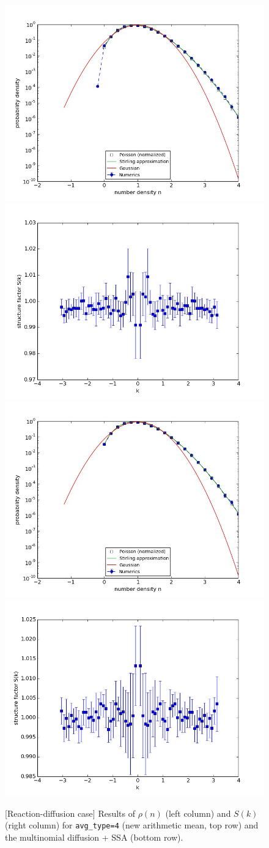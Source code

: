 \documentclass{article}
\begin{document}
\begin{figure}[ht!]
\includegraphics[width=0.5\linewidth]{fig1/react_hist_avg4.jpg}
\includegraphics[width=0.5\linewidth]{fig1/react_Sk_avg4.jpg}
\includegraphics[width=0.5\linewidth]{fig1/react_hist_mn.jpg}
\includegraphics[width=0.5\linewidth]{fig1/react_Sk_mn.jpg}
\caption{\label{fig_react_45}[Reaction-diffusion case] Results of $\rho(n)$ (left column) and $S(k)$ (right column) for \texttt{avg\_type=4} (new arithmetic mean, top row) and the multinomial diffusion + SSA (bottom row).
}
\end{figure}
\end{document}

